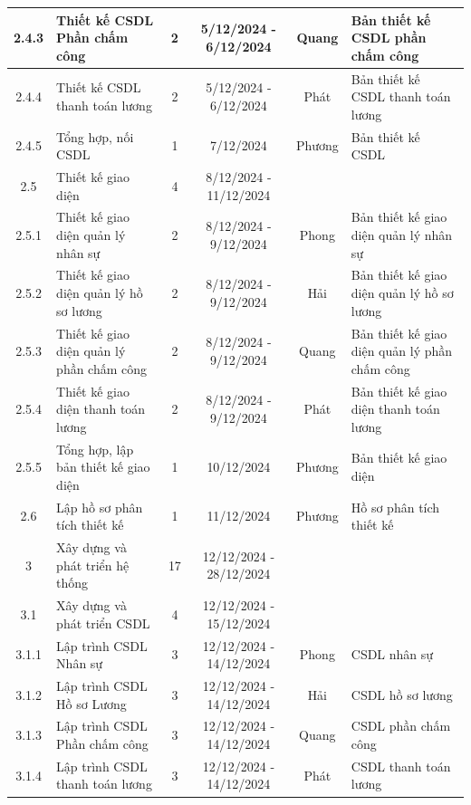 \begin{longtable}{|c|p{3cm}|c|c|c|p{2.8cm}|}
    2.4.3 & Thiết kế CSDL Phần chấm công & 2 & 5/12/2024 - 6/12/2024 & Quang & Bản thiết kế CSDL phần chấm công \\ \hline
    2.4.4 & Thiết kế CSDL thanh toán lương & 2 & 5/12/2024 - 6/12/2024 & Phát & Bản thiết kế CSDL thanh toán lương \\ \hline
    2.4.5 & Tổng hợp, nối CSDL & 1 & 7/12/2024 & Phương & Bản thiết kế CSDL \\ \hline
    2.5 & Thiết kế giao diện & 4 & 8/12/2024 - 11/12/2024 & \hspace{0pt} & \hspace{0pt}\\ \hline
    2.5.1 & Thiết kế giao diện quản lý nhân sự & 2 & 8/12/2024 - 9/12/2024 & Phong & Bản thiết kế giao diện quản lý nhân sự \\ \hline
    2.5.2 & Thiết kế giao diện quản lý hồ sơ lương & 2 & 8/12/2024 - 9/12/2024 & Hải & Bản thiết kế giao diện quản lý hồ sơ lương \\ \hline
    2.5.3 & Thiết kế giao diện quản lý phần chấm công & 2 & 8/12/2024 - 9/12/2024 & Quang & Bản thiết kế giao diện quản lý phần chấm công \\ \hline
    2.5.4 & Thiết kế giao diện thanh toán lương & 2 & 8/12/2024 - 9/12/2024 & Phát & Bản thiết kế giao diện thanh toán lương \\ \hline
    2.5.5 & Tổng hợp, lập bản thiết kế giao diện & 1 & 10/12/2024 & Phương & Bản thiết kế giao diện \\ \hline
    2.6 & Lập hồ sơ phân tích thiết kế & 1 & 11/12/2024 & Phương & Hồ sơ phân tích thiết kế \\ \hline
    3 & Xây dựng và phát triển hệ thống & 17 & 12/12/2024 - 28/12/2024 & \hspace{0pt} & \hspace{0pt}\\ \hline
    3.1 & Xây dựng và phát triển CSDL & 4 & 12/12/2024 - 15/12/2024 & \hspace{0pt} & \hspace{0pt}\\ \hline
    3.1.1 & Lập trình CSDL Nhân sự & 3 & 12/12/2024 - 14/12/2024 & Phong & CSDL nhân sự \\ \hline
    3.1.2 & Lập trình CSDL Hồ sơ Lương & 3 & 12/12/2024 - 14/12/2024 & Hải & CSDL hồ sơ lương \\ \hline
    3.1.3 & Lập trình CSDL Phần chấm công & 3 & 12/12/2024 - 14/12/2024 & Quang & CSDL phần chấm công \\ \hline
    3.1.4 & Lập trình CSDL thanh toán lương & 3 & 12/12/2024 - 14/12/2024 & Phát & CSDL thanh toán lương \\ \hline

\end{longtable}
